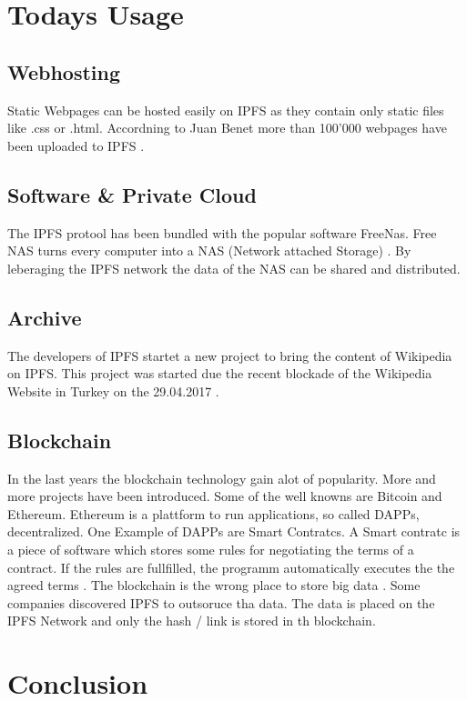 \documentclass[a4paper,11pt, oneside]{report}
\theoremstyle{definition}
\begin{document}
\chapter{Todays Usage}
\section{Webhosting}
Static Webpages can be hosted easily on IPFS as they contain only static files like .css or .html.
Accordning to Juan Benet more than 100'000 webpages have been uploaded to IPFS \cite{ipfs-usage-web}.
\section{Software \& Private Cloud}
The IPFS protool has been bundled with the popular software FreeNas. Free NAS turns every computer into a NAS (Network attached Storage) \cite{freenas}. By leberaging the IPFS network the data of the NAS can be shared and distributed.

\section{Archive}
The developers of IPFS startet a new project to bring the content of Wikipedia on IPFS. This project was started due the recent blockade of the Wikipedia Website in Turkey on the 29.04.2017 \cite{turkeyblock}.

\section{Blockchain}
In the last years the blockchain technology gain alot of popularity. More and more projects have been introduced. Some of the well knowns are Bitcoin and Ethereum. Ethereum is a plattform to run applications, so called DAPPs, decentralized. One Example of DAPPs are Smart Contratcs. A Smart contratc is a piece of software which stores some rules for negotiating the terms of a contract. If the rules are fullfilled, the programm automatically executes the the agreed terms \cite{ether}. The blockchain is the wrong place to store big data \cite{blockchain-data}. Some companies discovered IPFS to outsoruce tha data. The data is placed on the IPFS Network and only the hash  / link is stored in th blockchain.

\chapter{Conclusion}
\end{document}
